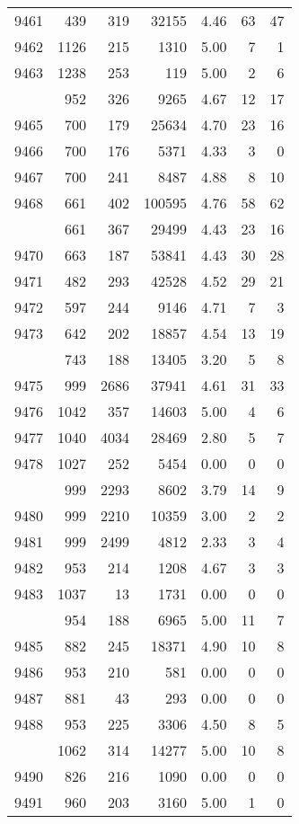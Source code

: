 \documentclass[
]{article}
\begin{document}
\begin{table}
\begin{tabular}[t]{lrrrrrr}
9461 & 439 & 319 & 32155 & 4.46 & 63 & 47\\
9462 & 1126 & 215 & 1310 & 5.00 & 7 & 1\\
9463 & 1238 & 253 & 119 & 5.00 & 2 & 6\\
\addlinespace
9464 & 952 & 326 & 9265 & 4.67 & 12 & 17\\
9465 & 700 & 179 & 25634 & 4.70 & 23 & 16\\
9466 & 700 & 176 & 5371 & 4.33 & 3 & 0\\
9467 & 700 & 241 & 8487 & 4.88 & 8 & 10\\
9468 & 661 & 402 & 100595 & 4.76 & 58 & 62\\
\addlinespace
9469 & 661 & 367 & 29499 & 4.43 & 23 & 16\\
9470 & 663 & 187 & 53841 & 4.43 & 30 & 28\\
9471 & 482 & 293 & 42528 & 4.52 & 29 & 21\\
9472 & 597 & 244 & 9146 & 4.71 & 7 & 3\\
9473 & 642 & 202 & 18857 & 4.54 & 13 & 19\\
\addlinespace
9474 & 743 & 188 & 13405 & 3.20 & 5 & 8\\
9475 & 999 & 2686 & 37941 & 4.61 & 31 & 33\\
9476 & 1042 & 357 & 14603 & 5.00 & 4 & 6\\
9477 & 1040 & 4034 & 28469 & 2.80 & 5 & 7\\
9478 & 1027 & 252 & 5454 & 0.00 & 0 & 0\\
\addlinespace
9479 & 999 & 2293 & 8602 & 3.79 & 14 & 9\\
9480 & 999 & 2210 & 10359 & 3.00 & 2 & 2\\
9481 & 999 & 2499 & 4812 & 2.33 & 3 & 4\\
9482 & 953 & 214 & 1208 & 4.67 & 3 & 3\\
9483 & 1037 & 13 & 1731 & 0.00 & 0 & 0\\
\addlinespace
9484 & 954 & 188 & 6965 & 5.00 & 11 & 7\\
9485 & 882 & 245 & 18371 & 4.90 & 10 & 8\\
9486 & 953 & 210 & 581 & 0.00 & 0 & 0\\
9487 & 881 & 43 & 293 & 0.00 & 0 & 0\\
9488 & 953 & 225 & 3306 & 4.50 & 8 & 5\\
\addlinespace
9489 & 1062 & 314 & 14277 & 5.00 & 10 & 8\\
9490 & 826 & 216 & 1090 & 0.00 & 0 & 0\\
9491 & 960 & 203 & 3160 & 5.00 & 1 & 0\\

\end{tabular}
\end{table}
\end{document}
